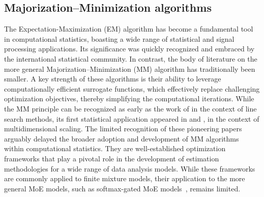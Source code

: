 \documentclass{article}
\newcommand{\md}{softmax-gated MoE }
\begin{document}
\subsection{Majorization–Minimization algorithms}\label{sec_intro_onlineMM}
The Expectation-Maximization (EM) \citep{dempster1977maximum,meilijson_fast_1989,mclachlan_em_1997} algorithm has become a fundamental tool in computational statistics, boasting a wide range of statistical and signal processing applications. Its significance was quickly recognized and embraced by the international statistical community. In contrast, the body of literature on the more general Majorization–Minimization (MM) algorithm \citep{ortega_iterative_1970,leeuw_application_1977,de_leeuw_convergence_1977,lange2016mm,sun_majorization_minimization_2017,nguyen_introduction_2017,lange_nonconvex_2021,mairal_incremental_2015,mairal2013stochastic} has traditionally been smaller. A key strength of these algorithms is their ability to leverage computationally efficient surrogate functions, which effectively replace challenging optimization objectives, thereby simplifying the computational iterations. While the MM principle can be recognized as early as the work of \cite{ortega_iterative_1970} in the context of line search methods, its first statistical application appeared in  \cite{leeuw_application_1977} and \cite{de_leeuw_convergence_1977}, in the context of multidimensional scaling. The limited recognition of these pioneering papers arguably delayed the broader adoption and development of MM algorithms within computational statistics. They are well-established optimization frameworks that play a pivotal role in the development of estimation methodologies for a wide range of data analysis models. While these frameworks are commonly applied to finite mixture models, their application to the more general MoE models, such as \md models~\citep{jacobs1991adaptive,jordan1994hierarchical}, remains limited.
\end{document}
